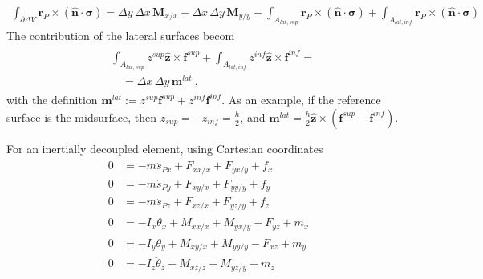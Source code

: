 \documentclass[letterpaper,10pt,english]{jupyterBook}
\begin{document}
\begin{equation*}
\begin{split}\int_{\partial \Delta V} \mathbf{r}_P \times ( \hat{\mathbf{n}} \cdot \boldsymbol\sigma ) 
 = \Delta y \, \Delta x \, \mathbf{M}_{x/x} + \Delta x \, \Delta y \, \mathbf{M}_{y/y} + \int_{A_{lat,sup}} \mathbf{r}_P \times ( \hat{\mathbf{n}} \cdot \boldsymbol\sigma )  + \int_{A_{lat,inf}} \mathbf{r}_P \times ( \hat{\mathbf{n}} \cdot \boldsymbol\sigma )  \end{split}
\end{equation*}
\sphinxAtStartPar
The contribution of the lateral surfaces becom
\begin{equation*}
\begin{split}\begin{aligned}
 & \int_{A_{lat,sup}} z^{sup} \hat{\mathbf{z}} \times \mathbf{f}^{sup} + \int_{A_{lat,inf}} z^{inf} \hat{\mathbf{z}} \times \mathbf{f}^{inf} = \\
 & \quad = \Delta x \, \Delta y \, \mathbf{m}^{lat} \ ,
\end{aligned}\end{split}
\end{equation*}
\sphinxAtStartPar
with  the definition \(\mathbf{m}^{lat} := z^{sup} \mathbf{f}^{sup} + z^{inf} \mathbf{f}^{inf}\). As an example, if the reference surface is the mid\sphinxhyphen{}surface, then \(z_{sup} = - z_{inf} = \tfrac{h}{2}\), and \(\mathbf{m}^{lat} = \tfrac{h}{2} \hat{\mathbf{z}} \times \left( \mathbf{f}^{sup} - \mathbf{f}^{inf} \right)\).

\sphinxAtStartPar
For an inertially decoupled element, using Cartesian coordinates
\begin{equation*}
\begin{split}\begin{aligned}
  0 & = - m   \ddot{s}_{Px}   + F_{xx/x} + F_{yx/y}              + f_x \\ 
  0 & = - m   \ddot{s}_{Py}   + F_{xy/x} + F_{yy/y}              + f_y \\ 
  0 & = - m   \ddot{s}_{Pz}   + F_{xz/x} + F_{yz/y}              + f_z \\ 
  0 & = - I_x \ddot{\theta}_x + M_{xx/x} + M_{yx/y} + F_{yz}     + m_x \\ 
  0 & = - I_y \ddot{\theta}_y + M_{xy/x} + M_{yy/y} - F_{xz}     + m_y \\ 
  0 & = - I_z \ddot{\theta}_z + M_{xz/z} + M_{yz/y}              + m_z \\ 
\end{aligned}\end{split}
\end{equation*}
\sphinxstepscope
\end{document}
